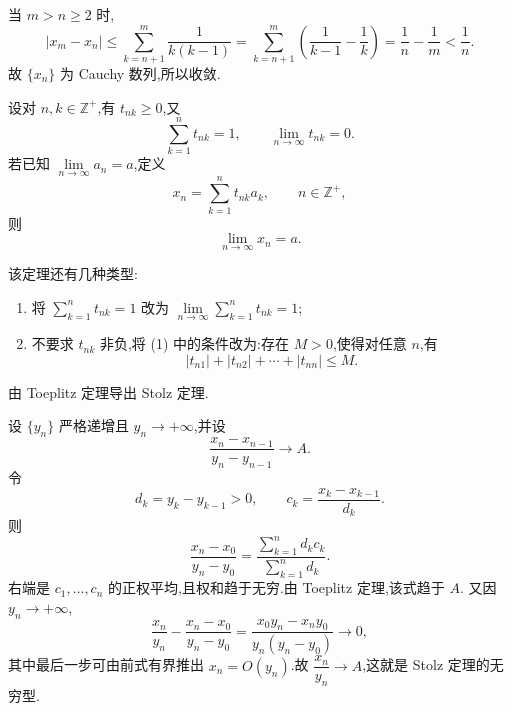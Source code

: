 \begin{solution}
  当 $m>n\geq2$ 时,
  \[
    |x_m-x_n|
    \leq\sum\limits_{k=n+1}^m\dfrac{1}{k(k-1)}
    =\sum\limits_{k=n+1}^m\left(\dfrac{1}{k-1}-\dfrac{1}{k}\right)
    =\dfrac{1}{n}-\dfrac{1}{m}<\dfrac{1}{n}.
  \]
  故 $\{x_n\}$ 为 Cauchy 数列,所以收敛.
\end{solution}




\begin{theorem}
  设对 $n,k\in\mathbb{Z}^+$,有 $t_{nk}\geq0$,又
  \[
    \displaystyle\sum\limits_{k=1}^n t_{nk}=1,
    \qquad
    \lim\limits_{n\to\infty}t_{nk}=0.
  \]
  若已知 $\displaystyle \lim\limits_{n\to\infty}a_n=a$,定义
  \[
    x_n=\sum\limits_{k=1}^n t_{nk}a_k,\qquad n\in\mathbb{Z}^+,
  \]
  则
  \[
    \displaystyle\lim\limits_{n\to\infty}x_n=a.
  \]
\end{theorem}

\begin{remark}
  该定理还有几种类型:
  \begin{enumerate}
    \item 将 $\displaystyle \sum\limits_{k=1}^n t_{nk}=1$ 改为
          $\displaystyle \lim\limits_{n\to\infty}\sum\limits_{k=1}^n t_{nk}=1$;
    \item 不要求 $t_{nk}$ 非负,将 (1) 中的条件改为:存在 $M>0$,使得对任意 $n$,有
          \[
            |t_{n1}|+|t_{n2}|+\cdots+|t_{nn}|\leq M.
          \]
  \end{enumerate}
\end{remark}

\begin{example}
  由 Toeplitz 定理导出 Stolz 定理.
\end{example}
\exampleblank

\begin{solution}
  设 $\{y_n\}$ 严格递增且 $y_n\to+\infty$,并设
  \[
    \dfrac{x_n-x_{n-1}}{y_n-y_{n-1}}\longrightarrow A.
  \]
  令
  \[
    d_k=y_k-y_{k-1}>0,
    \qquad
    c_k=\dfrac{x_k-x_{k-1}}{d_k}.
  \]
  则
  \[
    \dfrac{x_n-x_0}{y_n-y_0}
    =\dfrac{\displaystyle\sum\limits_{k=1}^n d_kc_k}{\displaystyle\sum\limits_{k=1}^n d_k}.
  \]
  右端是 $c_1,\ldots,c_n$ 的正权平均,且权和趋于无穷.由 Toeplitz 定理,该式趋于 $A$.
  又因 $y_n\to+\infty$,
  \[
    \dfrac{x_n}{y_n}-\dfrac{x_n-x_0}{y_n-y_0}
    =\dfrac{x_0y_n-x_ny_0}{y_n(y_n-y_0)}\longrightarrow0,
  \]
  其中最后一步可由前式有界推出 $x_n=O(y_n)$.故
  $\dfrac{x_n}{y_n}\to A$,这就是 Stolz 定理的无穷型.
\end{solution}

